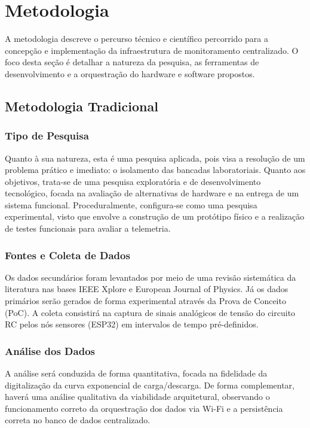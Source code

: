 \chapter{Metodologia}
A metodologia descreve o percurso técnico e científico percorrido para a concepção e implementação da infraestrutura de monitoramento centralizado. O foco desta seção é detalhar a natureza da pesquisa, as ferramentas de desenvolvimento e a orquestração do hardware e software propostos.

\section{Metodologia Tradicional}
\subsection{Tipo de Pesquisa}
Quanto à sua natureza, esta é uma pesquisa aplicada, pois visa a resolução de um problema prático e imediato: o isolamento das bancadas laboratoriais. Quanto aos objetivos, trata-se de uma pesquisa exploratória e de desenvolvimento tecnológico, focada na avaliação de alternativas de hardware e na entrega de um sistema funcional. Proceduralmente, configura-se como uma pesquisa experimental, visto que envolve a construção de um protótipo físico e a realização de testes funcionais para avaliar a telemetria.

\subsection{Fontes e Coleta de Dados}
Os dados secundários foram levantados por meio de uma revisão sistemática da literatura nas bases IEEE Xplore e European Journal of Physics. Já os dados primários serão gerados de forma experimental através da Prova de Conceito (PoC). A coleta consistirá na captura de sinais analógicos de tensão do circuito RC pelos nós sensores (ESP32) em intervalos de tempo pré-definidos.

\subsection{Análise dos Dados}
A análise será conduzida de forma quantitativa, focada na fidelidade da digitalização da curva exponencial de carga/descarga. De forma complementar, haverá uma análise qualitativa da viabilidade arquitetural, observando o funcionamento correto da orquestração dos dados via Wi-Fi e a persistência correta no banco de dados centralizado.


